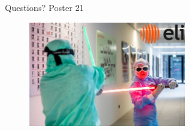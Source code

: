 \documentclass{beamer}
\newcommand{\notebox}[1]{\colorbox{myprimary!30}{#1}}
\begin{document}
\begin{frame}
    Questions? \notebox{Poster 21}
    \begin{figure}
        \includegraphics[width=0.6\textwidth]{images/sabers.jpg}
    \end{figure}
\end{frame}
\end{document}
